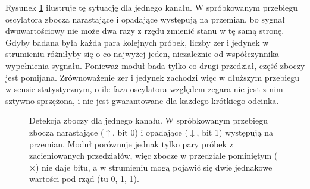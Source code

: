 Rysunek \ref{fig:detekcja-zboczy} ilustruje tę sytuację dla jednego kanału.
W spróbkowanym przebiegu oscylatora zbocza narastające i opadające występują na
przemian, bo sygnał dwuwartościowy nie może dwa razy z rzędu zmienić stanu
w tę samą stronę. Gdyby badana była każda para kolejnych próbek, liczby zer
i jedynek w strumieniu różniłyby się o co najwyżej jeden, niezależnie od
współczynnika wypełnienia sygnału. Ponieważ moduł bada tylko co drugi przedział,
część zboczy jest pomijana. Zrównoważenie zer i jedynek zachodzi więc
w dłuższym przebiegu w sensie statystycznym, o ile faza oscylatora względem
zegara nie jest z nim sztywno sprzężona, i nie jest gwarantowane dla każdego
krótkiego odcinka.

\begin{figure}[H]
  \centering
  \caption{Detekcja zboczy dla jednego kanału. W spróbkowanym przebiegu
  zbocza narastające ($\uparrow$, bit 0) i opadające ($\downarrow$, bit 1)
  występują na przemian. Moduł porównuje jednak tylko pary próbek
  z zacieniowanych przedziałów, więc zbocze w przedziale pominiętym
  ($\times$) nie daje bitu, a w strumieniu mogą pojawić się dwie jednakowe
  wartości pod rząd (tu 0, 1, 1).}
  \label{fig:detekcja-zboczy}
\end{figure}

